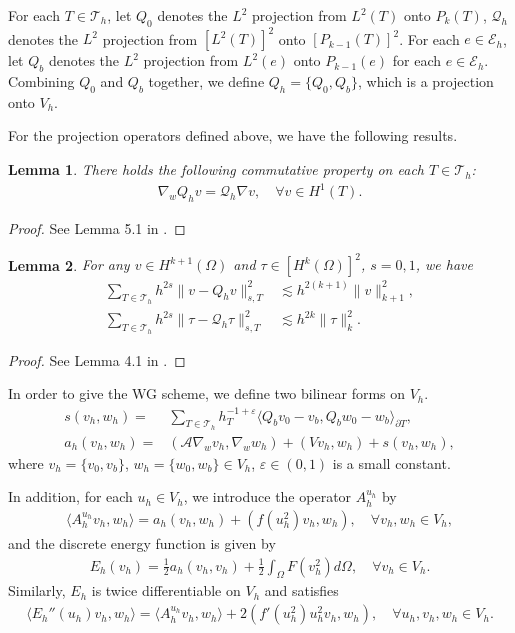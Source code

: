 \documentclass[compress, preprint,9pt]{elsarticle}
\numberwithin{equation}{section}
\newtheorem{lemma}{Lemma}[section]
\newcommand{\E}{\mathcal{E}}
\newcommand{\T}{{\mathcal{T}}}
\newcommand{\Q}{{\mathcal{Q}}}
\newcommand{\sumT}{\sum_{T\in\mathcal{T}_h}}     %
\newcommand{\eps}{\varepsilon}
\newcommand{\A}{\mathcal{A}}
\newcommand{\la}{\langle}
\newcommand{\ran}{\rangle}
\begin{document}
	For each $T\in\T_h$, let $Q_0$ denotes the $L^2$ projection from $L^2(T)$ onto $ P_k(T)$, $\Q_h$ denotes the $L^2$ projection from $[L^2(T)]^{2}$ onto $[P_{k-1}(T)]^{2}$.
	For each $e\in\E_h$, let $Q_b$ denotes the $L^2$ projection from $L^2(e)$ onto $ P_{k-1}(e)$ for each $e\in\E_h$.
	Combining $Q_0$ and $Q_b$ together, we define $Q_h=\{Q_0,Q_b\}$,
	which is a projection onto $V_h$.
	
	For the projection operators defined above, we have the following results.
	\begin{lemma}\label{lem3}
		There holds the following commutative property on each $T\in\T_h$:
		\begin{eqnarray*}
			\nabla_wQ_hv=\Q_h\nabla v, \quad\forall v\in H^1(T).
		\end{eqnarray*}
	\end{lemma}
	\begin{proof}
		See Lemma 5.1 in \cite{Mu2013c}.
	\end{proof}
	
	\begin{lemma}
		For any $v\in H^{k+1}(\Omega)$ and $\tau\in [H^k(\Omega)]^2$, $s=0,1$, we have
		\begin{eqnarray}
			\sumT h^{2s}\|v-Q_hv\|_{s,T}^2&\lesssim h^{2(k+1)}\|v\|_{k+1}^2,\label{pro1}\\
			\sumT h^{2s}\|\tau-\Q_h\tau\|_{s,T}^2&\lesssim h^{2k}\|\tau\|_k^2.\label{pro2}
		\end{eqnarray}
	\end{lemma}
	\begin{proof}
		See Lemma 4.1 in \cite{Wang2014a}.
	\end{proof}
	
	In order to give the WG scheme, we define two bilinear forms on $V_h$.
	\begin{eqnarray}
		s( v_h, w_h)=&\sumT h_T^{-1+\eps}\langle  Q_bv_0- v_b, Q_bw_0- w_b\rangle_{\partial T},\label{2.1}\\
		a_h( v_h, w_h)=&(\A\nabla_wv_h,\nabla_ww_h)+(Vv_h,w_h)+s(v_h,w_h),\label{2.2}
	\end{eqnarray}
	where $v_h=\{v_0,v_b\}$, $w_h=\{w_0,w_b\}\in V_h$, $\eps\in(0,1)$ is a small constant.
	
	In addition, for each $u_h\in V_h$, we introduce the operator $A_h^{u_h}$ by
	\begin{eqnarray}\label{2.3}
		\la A_h^{u_h}v_h, w_h\ran=a_h( v_h, w_h)+(f(u_h^2)v_h,w_h), \quad\forall v_h,w_h\in V_h,
	\end{eqnarray}
	and the discrete energy function is given by
	\begin{eqnarray}\label{Eh}
		E_h(v_h)=\frac12 a_h(v_h,v_h)+\frac12\displaystyle\int_\Omega F(v_h^2)d\Omega, \quad\forall v_h\in V_h.
	\end{eqnarray}
	Similarly, $E_h$ is twice differentiable on $V_h$ and satisfies
	\begin{eqnarray}\label{E''h}
		\la E_h''(u_h)v_h,w_h\ran=\la A_h^{u_h}v_h,w_h\ran+2(f'(u_h^2)u_h^2v_h,w_h),\quad\forall u_h, v_h,w_h\in V_h.
	\end{eqnarray}
	
\end{document}
